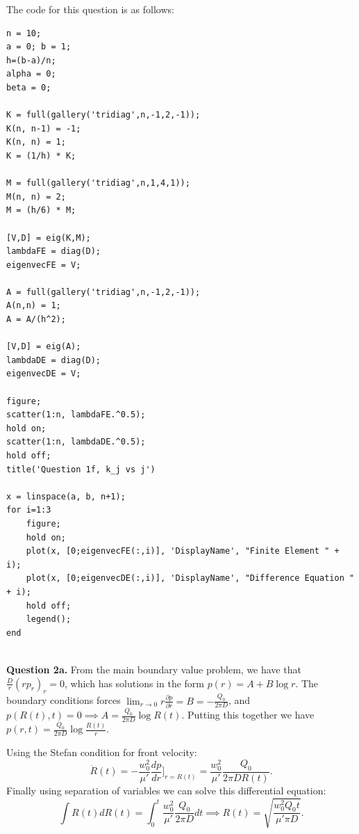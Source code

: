 \documentclass[letterpaper, reqno,11pt]{article}
\begin{document}
The code for this question is as follows:
\begin{lstlisting}
n = 10;
a = 0; b = 1;
h=(b-a)/n;
alpha = 0;
beta = 0;

K = full(gallery('tridiag',n,-1,2,-1));
K(n, n-1) = -1;
K(n, n) = 1;
K = (1/h) * K;

M = full(gallery('tridiag',n,1,4,1));
M(n, n) = 2;
M = (h/6) * M;

[V,D] = eig(K,M);
lambdaFE = diag(D);
eigenvecFE = V;

A = full(gallery('tridiag',n,-1,2,-1));
A(n,n) = 1;
A = A/(h^2);

[V,D] = eig(A);
lambdaDE = diag(D);
eigenvecDE = V;

figure;
scatter(1:n, lambdaFE.^0.5);
hold on;
scatter(1:n, lambdaDE.^0.5);
hold off;
title('Question 1f, k_j vs j')

x = linspace(a, b, n+1);
for i=1:3
    figure;
    hold on;
    plot(x, [0;eigenvecFE(:,i)], 'DisplayName', "Finite Element " + i);
    plot(x, [0;eigenvecDE(:,i)], 'DisplayName', "Difference Equation " + i);
    hold off;
    legend();
end


\end{lstlisting}

{\medskip\noindent\bf Question 2a.} From the main boundary value problem, we have that $\frac{D}{r}(rp_r)_r=0$, which has solutions in the form $p(r)=A+B\log r$. The boundary conditions forces $\lim_{r\to 0}r \frac{\partial p}{\partial r}=B=-\frac{Q_0}{2\pi D}$, and $p(R(t),t)=0\implies A=\frac{Q_0}{2\pi D}\log R(t)$. Putting this together we have $p(r,t)=\frac{Q_0}{2\pi D}\log \frac{R(t)}{r}$.

Using the Stefan condition for front velocity:
\[
\dot R(t)= -\frac{w_0^2}{\mu'}\frac{dp}{dr}\bigg]_{r=R(t)}=\frac{w_0^2}{\mu'}\frac{Q_0}{2\pi DR(t)}
.\]
Finally using separation of variables we can solve this differential equation:
\[
\int R(t)dR(t)=\int_0^{t}\frac{w_0^2}{\mu'}\frac{Q_0}{2\pi D}dt\implies R(t)=\sqrt{\frac{w_0^2Q_0t}{\mu'\pi D}}
.\]
\end{document}
